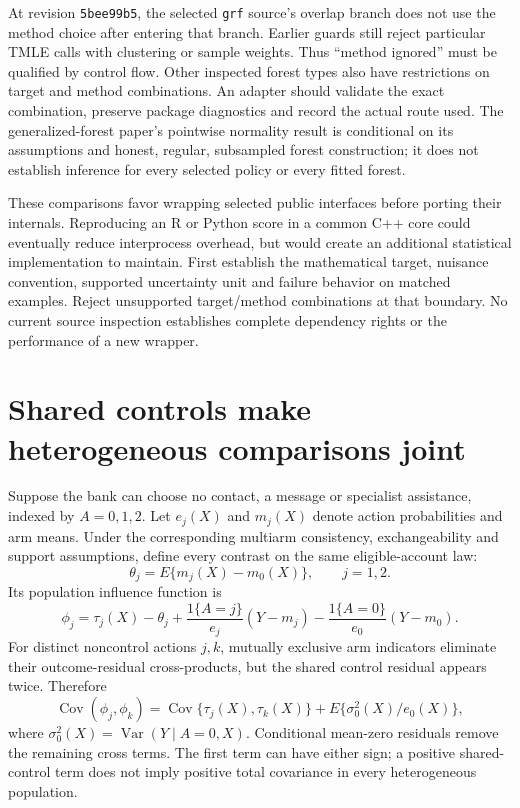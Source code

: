 At revision \texttt{5bee99b5}, the selected \texttt{grf} source's overlap branch
does not use the method choice after entering that branch. Earlier guards
still reject particular TMLE calls with clustering or sample weights. Thus
``method ignored'' must be qualified by control flow. Other inspected forest
types also have restrictions on target and method combinations. An adapter
should validate the exact combination, preserve package diagnostics and
record the actual route used. The generalized-forest paper's pointwise
normality result is conditional on its assumptions and honest, regular,
subsampled forest construction; it does not establish inference for every
selected policy or every fitted forest.~\citep{exec13_grf_rpath,exec13_grf_native,grf2018}

These comparisons favor wrapping selected public interfaces before porting
their internals. Reproducing an R or Python score in a common C++ core could
eventually reduce interprocess overhead, but would create an additional
statistical implementation to maintain. First establish the mathematical
target, nuisance convention, supported uncertainty unit and failure behavior
on matched examples. Reject unsupported target/method combinations at that
boundary. No current source inspection establishes complete dependency rights
or the performance of a new wrapper.~\citep{exec17_s4_design}

\section{Shared controls make heterogeneous comparisons joint}
\label{exec17:s4-joint}

Suppose the bank can choose no contact, a message or specialist assistance,
indexed by $A=0,1,2$. Let $e_j(X)$ and $m_j(X)$ denote action probabilities
and arm means. Under the corresponding multiarm consistency, exchangeability
and support assumptions, define every contrast on the same eligible-account
law:
\[
 \theta_j=E\{m_j(X)-m_0(X)\},\qquad j=1,2.
\]
Its population influence function is
\[
 \phi_j=\tau_j(X)-\theta_j+
       \frac{1\{A=j\}}{e_j}(Y-m_j)
       -\frac{1\{A=0\}}{e_0}(Y-m_0).
\]
For distinct noncontrol actions $j,k$, mutually exclusive arm indicators
eliminate their outcome-residual cross-products, but the shared control
residual appears twice. Therefore
\begin{equation}
 \operatorname{Cov}(\phi_j,\phi_k)=
 \operatorname{Cov}\{\tau_j(X),\tau_k(X)\}
       +E\{\sigma_0^2(X)/e_0(X)\},
 \label{exec17:s4-shared-control}
\end{equation}
where $\sigma_0^2(X)=\operatorname{Var}(Y\mid A=0,X)$.
Conditional mean-zero residuals remove the remaining cross terms. The first
term can have either sign; a positive shared-control term does not imply
positive total covariance in every heterogeneous population.

